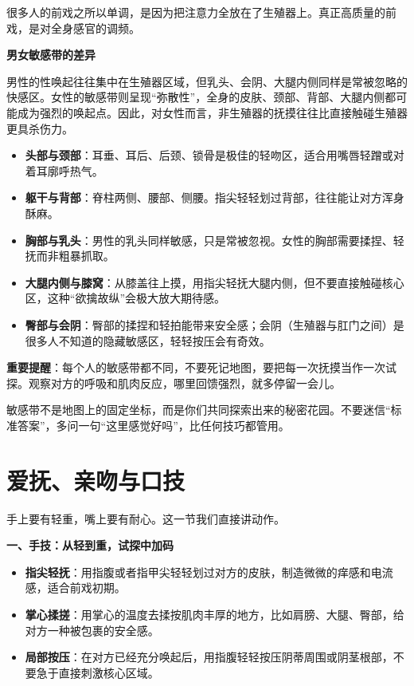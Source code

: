 \documentclass[12pt,UTF8]{ctexbook}
\begin{document}
很多人的前戏之所以单调，是因为把注意力全放在了生殖器上。真正高质量的前戏，是对全身感官的调频。

\textbf{男女敏感带的差异}

男性的性唤起往往集中在生殖器区域，但乳头、会阴、大腿内侧同样是常被忽略的快感区。女性的敏感带则呈现“弥散性”，全身的皮肤、颈部、背部、大腿内侧都可能成为强烈的唤起点。因此，对女性而言，非生殖器的抚摸往往比直接触碰生殖器更具杀伤力。

\begin{itemize}
\item \textbf{头部与颈部}：耳垂、耳后、后颈、锁骨是极佳的轻吻区，适合用嘴唇轻蹭或对着耳廓呼热气。
\item \textbf{躯干与背部}：脊柱两侧、腰部、侧腰。指尖轻轻划过背部，往往能让对方浑身酥麻。
\item \textbf{胸部与乳头}：男性的乳头同样敏感，只是常被忽视。女性的胸部需要揉捏、轻抚而非粗暴抓取。
\item \textbf{大腿内侧与膝窝}：从膝盖往上摸，用指尖轻抚大腿内侧，但不要直接触碰核心区，这种“欲擒故纵”会极大放大期待感。
\item \textbf{臀部与会阴}：臀部的揉捏和轻拍能带来安全感；会阴（生殖器与肛门之间）是很多人不知道的隐藏敏感区，轻轻按压会有奇效。
\end{itemize}

\textbf{重要提醒}：每个人的敏感带都不同，不要死记地图，要把每一次抚摸当作一次试探。观察对方的呼吸和肌肉反应，哪里回馈强烈，就多停留一会儿。

\begin{tcolorbox}[colback=pink!5!white,colframe=red!50!black,title=贴心小叮咛]
敏感带不是地图上的固定坐标，而是你们共同探索出来的秘密花园。不要迷信“标准答案”，多问一句“这里感觉好吗”，比任何技巧都管用。
\end{tcolorbox}

\section{爱抚、亲吻与口技}

手上要有轻重，嘴上要有耐心。这一节我们直接讲动作。

\textbf{一、手技：从轻到重，试探中加码}

\begin{itemize}
\item \textbf{指尖轻抚}：用指腹或者指甲尖轻轻划过对方的皮肤，制造微微的痒感和电流感，适合前戏初期。
\item \textbf{掌心揉搓}：用掌心的温度去揉按肌肉丰厚的地方，比如肩膀、大腿、臀部，给对方一种被包裹的安全感。
\item \textbf{局部按压}：在对方已经充分唤起后，用指腹轻轻按压阴蒂周围或阴茎根部，不要急于直接刺激核心区域。
\end{itemize}
\end{document}
